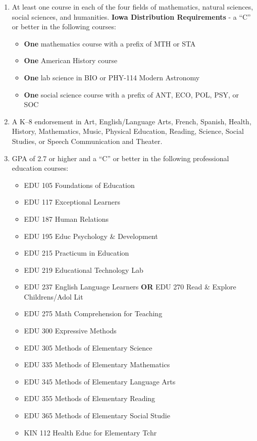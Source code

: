 \documentclass[
  letterpaper,
]{scrbook}
\providecommand{\tightlist}{%
  \setlength{\itemsep}{0pt}\setlength{\parskip}{0pt}}
\begin{document}
\begin{enumerate}
\def\labelenumi{\arabic{enumi}.}
\item
  At least one course in each of the four fields of mathematics, natural
  sciences, social sciences, and humanities. \textbf{Iowa Distribution
  Requirements} - a ``C'' or better in the following courses:

  \begin{itemize}
  \tightlist
  \item
    \textbf{One} mathematics course with a prefix of MTH or STA
  \item
    \textbf{One} American History course
  \item
    \textbf{One} lab science in BIO or PHY-114 Modern Astronomy
  \item
    \textbf{One} social science course with a prefix of ANT, ECO, POL,
    PSY, or SOC
  \end{itemize}
\item
  A K--8 endorsement in Art, English/Language Arts, French, Spanish,
  Health, History, Mathematics, Music, Physical Education, Reading,
  Science, Social Studies, or Speech Communication and Theater.
\item
  GPA of 2.7 or higher and a ``C'' or better in the following
  professional education courses:

  \begin{itemize}
  \tightlist
  \item
    EDU 105 Foundations of Education
  \item
    EDU 117 Exceptional Learners
  \item
    EDU 187 Human Relations
  \item
    EDU 195 Educ Psychology \& Development
  \item
    EDU 215 Practicum in Education
  \item
    EDU 219 Educational Technology Lab
  \item
    EDU 237 English Language Learners \textbf{OR} EDU 270 Read \&
    Explore Childrens/Adol Lit
  \item
    EDU 275 Math Comprehension for Teaching
  \item
    EDU 300 Expressive Methods
  \item
    EDU 305 Methods of Elementary Science
  \item
    EDU 335 Methods of Elementary Mathematics
  \item
    EDU 345 Methods of Elementary Language Arts
  \item
    EDU 355 Methods of Elementary Reading
  \item
    EDU 365 Methods of Elementary Social Studie
  \item
    KIN 112 Health Educ for Elementary Tchr
  \end{itemize}
\end{enumerate}
\end{document}
